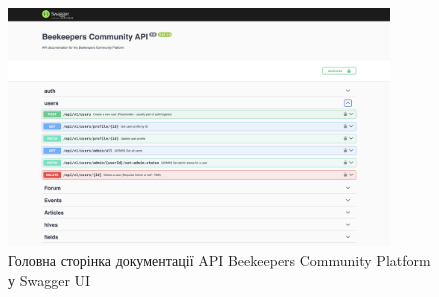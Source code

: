 \begin{figure}[H]
  \centering
  \includegraphics[width=0.9\textwidth]{practice_report/images/swagger.png}
  \caption{Головна сторінка документації API Beekeepers Community Platform у Swagger UI}
  \label{fig:swagger}
\end{figure}



